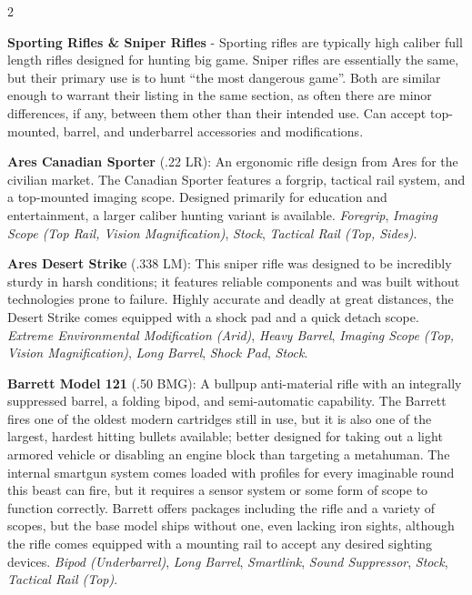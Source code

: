 \documentclass[
  oneside]{article}
\begin{document}
\begin{multicols}{2}

\textbf{Sporting Rifles \& Sniper Rifles} -
Sporting rifles are typically high caliber full
length rifles designed for hunting big game.
Sniper rifles are essentially the same, but their
primary use is to hunt ``the most dangerous
game''. Both are similar enough to warrant their
listing in the same section, as often there are
minor differences, if any, between them other than
their intended use. Can accept top-mounted,
barrel, and underbarrel accessories and
modifications.

\textbf{Ares Canadian Sporter} (.22 LR): An
ergonomic rifle design from Ares for the civilian
market. The Canadian Sporter features a forgrip,
tactical rail system, and a top-mounted imaging
scope. Designed primarily for education and
entertainment, a larger caliber hunting variant is
available. \emph{Foregrip}, \emph{Imaging Scope
(Top Rail, Vision Magnification)}, \emph{Stock},
\emph{Tactical Rail (Top, Sides)}.

\textbf{Ares Desert Strike} (.338 LM): This sniper
rifle was designed to be incredibly sturdy in
harsh conditions; it features reliable components
and was built without technologies prone to
failure. Highly accurate and deadly at great
distances, the Desert Strike comes equipped with a
shock pad and a quick detach scope. \emph{Extreme
Environmental Modification (Arid)}, \emph{Heavy
Barrel}, \emph{Imaging Scope (Top, Vision
Magnification)}, \emph{Long Barrel}, \emph{Shock
Pad}, \emph{Stock}.

\textbf{Barrett Model 121} (.50 BMG): A bullpup
anti-material rifle with an integrally suppressed
barrel, a folding bipod, and semi-automatic
capability. The Barrett fires one of the oldest
modern cartridges still in use, but it is also one
of the largest, hardest hitting bullets available;
better designed for taking out a light armored
vehicle or disabling an engine block than
targeting a metahuman. The internal smartgun
system comes loaded with profiles for every
imaginable round this beast can fire, but it
requires a sensor system or some form of scope to
function correctly. Barrett offers packages
including the rifle and a variety of scopes, but
the base model ships without one, even lacking
iron sights, although the rifle comes equipped
with a mounting rail to accept any desired
sighting devices. \emph{Bipod (Underbarrel)},
\emph{Long Barrel}, \emph{Smartlink}, \emph{Sound
Suppressor}, \emph{Stock}, \emph{Tactical Rail
(Top)}.


\end{multicols}
\end{document}
